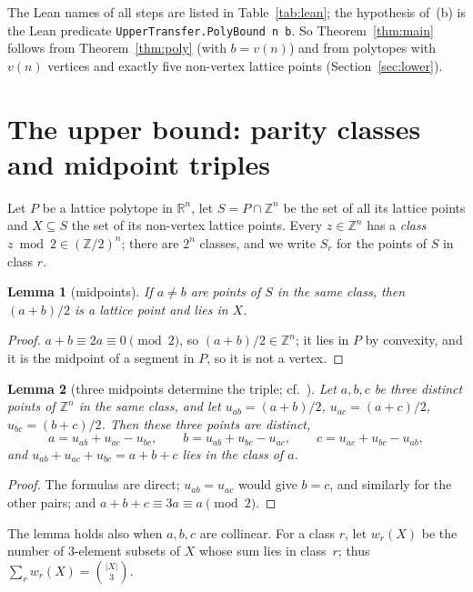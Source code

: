 \documentclass[11pt]{article}
\newtheorem{lemma}{Lemma}
\theoremstyle{definition}
\theoremstyle{remark}
\newcommand{\Z}{\mathbb Z}
\newcommand{\R}{\mathbb R}
\begin{document}
\noindent The Lean names of all steps are listed in Table~\ref{tab:lean}; the
hypothesis of~(b) is the Lean predicate \texttt{UpperTransfer.PolyBound n b}. So Theorem~\ref{thm:main}
follows from Theorem~\ref{thm:poly} (with $b=v(n)$) and from polytopes with
$v(n)$ vertices and exactly five non-vertex lattice points
(Section~\ref{sec:lower}).


\section{The upper bound: parity classes and midpoint triples}\label{sec:upper}

Let $P$ be a lattice polytope in $\R^n$, let $S=P\cap\Z^n$ be the set of all its
lattice points and $X\subseteq S$ the set of its non-vertex lattice points.
Every $z\in\Z^n$ has a \emph{class} $z\bmod2\in(\Z/2)^n$; there are $2^n$
classes, and we write $S_r$ for the points of $S$ in class $r$.

\begin{lemma}[midpoints]\label{lem:mid}
If $a\ne b$ are points of $S$ in the same class, then $(a+b)/2$ is a lattice
point and lies in $X$.
\end{lemma}

\begin{proof}
$a+b\equiv2a\equiv0\pmod2$, so $(a+b)/2\in\Z^n$; it lies in $P$ by convexity,
and it is the midpoint of a segment in $P$, so it is not a vertex.
\end{proof}

\begin{lemma}[three midpoints determine the triple; cf.~{\cite[proof of Theorem~5]{agm}}]\label{lem:triple}
Let $a,b,c$ be three distinct points of $\Z^n$ in the same class, and let
$u_{ab}=(a+b)/2$, $u_{ac}=(a+c)/2$, $u_{bc}=(b+c)/2$. Then these three points
are distinct,
\[
a=u_{ab}+u_{ac}-u_{bc},\qquad b=u_{ab}+u_{bc}-u_{ac},\qquad c=u_{ac}+u_{bc}-u_{ab},
\]
and $u_{ab}+u_{ac}+u_{bc}=a+b+c$ lies in the class of $a$.
\end{lemma}

\begin{proof}
The formulas are direct; $u_{ab}=u_{ac}$ would give $b=c$, and similarly
for the other pairs; and $a+b+c\equiv3a\equiv a\pmod 2$.
\end{proof}

\noindent The lemma holds also when $a,b,c$ are collinear. For a class $r$, let
$w_r(X)$ be the number of $3$-element subsets of $X$ whose sum lies in
class~$r$; thus $\sum_rw_r(X)=\binom{|X|}3$.
\end{document}
